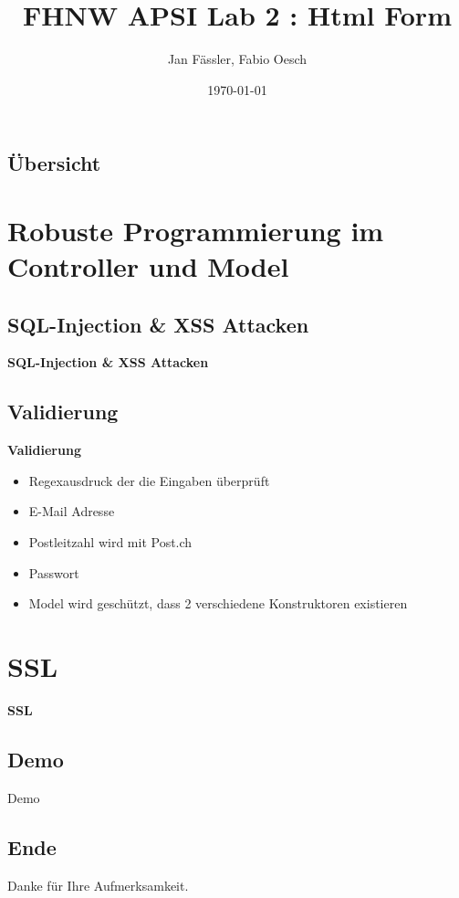\documentclass{beamer}
\begin{document}
\title{FHNW APSI Lab 2 : Html Form}   
\author{Jan Fässler, Fabio Oesch} 

\date{\today} 

\frame{\titlepage} 

\begin{frame}
\section*{Übersicht}
\tableofcontents
\end{frame} 

\section{Robuste Programmierung im Controller und Model} 
\begin{frame}
 \subsection{SQL-Injection \& XSS Attacken}
 \textbf{SQL-Injection \& XSS Attacken}
\end{frame}

\subsection{Validierung}
\begin{frame}
 \textbf{Validierung}\\
 \begin{itemize}
  \item Regexausdruck der die Eingaben überprüft
  \item E-Mail Adresse
  \item Postleitzahl wird mit Post.ch
  \item Passwort
  \item Model wird geschützt, dass 2 verschiedene Konstruktoren existieren
 \end{itemize}
\end{frame}

\section{SSL}
\begin{frame}
 \textbf{SSL}\\
\end{frame}



\begin{frame}
\section{Demo}
 \huge Demo
\end{frame}

\begin{frame}
\section*{Ende}
 \huge Danke für Ihre Aufmerksamkeit.
\end{frame}
\end{document}
